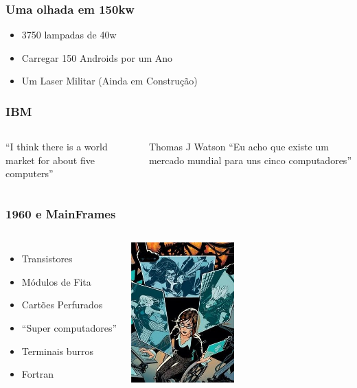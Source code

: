 \documentclass{beamer}
\begin{document}
\begin{frame} \frametitle{Uma olhada em 150kw}
    \begin{itemize}
    \item 3750 lampadas de 40w
    \item Carregar 150 Androids por um Ano
    \item Um Laser Militar (Ainda em Construção)
    \end{itemize}
\end{frame}

\begin{frame} \frametitle{IBM}
    \begin{columns}
        ``I think there is a world market for about five computers''

        Thomas J Watson
        \pause
        ``Eu acho que existe um mercado mundial para uns cinco computadores''
    \end{columns}
\end{frame}

\begin{frame} \frametitle{1960 e MainFrames}
    \begin{columns}
        \begin{itemize}
            \item Transistores
            \item Módulos de Fita
            \item Cartões Perfurados
            \item ``Super computadores''
            \item Terminais burros
            \item Fortran
        \end{itemize}
            \includegraphics[width=150px]{images/oraculo}
    \end{columns}
\end{frame}
\end{document}
